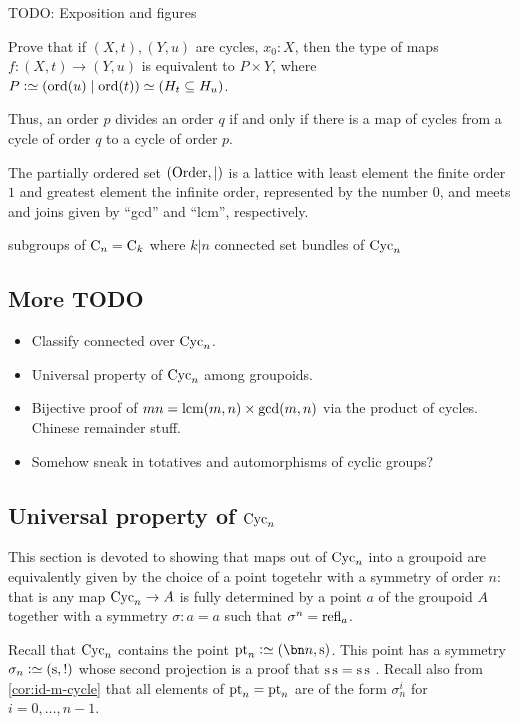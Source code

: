 {\color{casblue} TODO: Exposition and figures

\begin{xca}
  Prove that if $(X,t),(Y,u)$ are cycles, $x_0:X$,
  then the type of maps $f : (X,t) \to (Y,u)$ is equivalent to $P\times Y$,
  where $P\defeq(\ord(u) \mid \ord(t)) \jdeq (H_t \subseteq H_u)$.
\end{xca}

Thus, an order $p$ divides an order $q$ if and only if
there is a map of cycles from a cycle of order $q$
to a cycle of order $p$.
\begin{theorem}
  The partially ordered set $(\mathrm{Order},|)$ is a lattice
  with least element the finite order $1$
  and greatest element the infinite order, represented by the number $0$,
  and meets and joins given by “gcd” and “lcm”, respectively.
\end{theorem}

subgroups of $\mathrm{C}_n = \mathrm{C}_k$ where $k | n$
connected set bundles of $\mathrm{Cyc}_n$

\subsection{More TODO}

\begin{itemize}
\item Classify connected \coverings over $\mathrm{Cyc}_n$.
\item Universal property of $\mathrm{Cyc}_n$ among groupoids.
\item Bijective proof of $mn = \lcm(m,n)\times\gcd(m,n)$ via the product of cycles.
  Chinese remainder stuff.
\item Somehow sneak in totatives and automorphisms of cyclic groups?
\end{itemize}
}

\subsection{Universal property of $\mathrm{Cyc}_n$}

This section is devoted to showing that maps out of $\mathrm{Cyc}_n$ into a groupoid
are equivalently given by the choice of a point togetehr with a symmetry of
order $n$: that is any map $\mathrm{Cyc}_n \to A$ is fully determined by a point $a$ of
the groupoid $A$ together with a symmetry $\sigma:a=a$ such that
$\sigma^n=\mathrm{refl}_{a}$.

Recall that $\mathrm{Cyc}_n$ contains the point $\pt_n \defequi (\bn n, \zs)$. This
point has a symmetry $\sigma_n \defequi (\zs, !)$ whose second projection is a
proof that $\zs\zs = \zs\zs$ . 
%
Recall also from \cref{cor:id-m-cycle} that all elements of $\mathrm{pt}_n = \mathrm{pt}_n$ are
of the form $\sigma_n^i$ for $i=0,\dots,n-1$.

